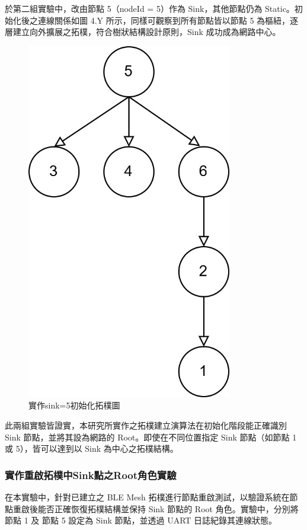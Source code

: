 \begin{ZhChapter}
於第二組實驗中，改由節點 5（nodeId = 5）作為 Sink，其他節點仍為 Static。初始化後之連線關係如圖 4.Y 所示，同樣可觀察到所有節點皆以節點 5 為樞紐，逐層建立向外擴展之拓樸，符合樹狀結構設計原則，Sink 成功成為網路中心。

\begin{figure}[H]
    \centering
    \includegraphics[width = 0.8\textwidth]{image/實作sink=5初始化拓樸圖.jpg}
    \caption{實作sink=5初始化拓樸圖}
    \label{fig: 實作sink=5初始化拓樸圖}
\end{figure}

此兩組實驗皆證實，本研究所實作之拓樸建立演算法在初始化階段能正確識別 Sink 節點，並將其設為網路的 Root。即使在不同位置指定 Sink 節點（如節點 1 或 5），皆可以達到以 Sink 為中心之拓樸結構。

\subsubsection{實作重啟拓樸中Sink點之Root角色實驗}
在本實驗中，針對已建立之 BLE Mesh 拓樸進行節點重啟測試，以驗證系統在節點重啟後能否正確恢復拓樸結構並保持 Sink 節點的 Root 角色。實驗中，分別將節點 1 及 節點 5 設定為 Sink 節點，並透過 UART 日誌紀錄其連線狀態。


\end{ZhChapter}
